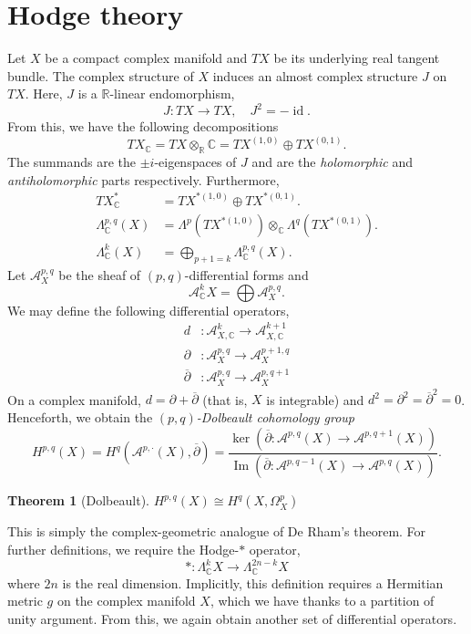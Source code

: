 \documentclass[10pt, a4paper]{article}
\theoremstyle{plain}
\newtheorem{thrm}{Theorem}[section]
\theoremstyle{definition}
\DeclareMathOperator{\Ima}{Im}
\DeclareMathOperator{\id}{id}
\begin{document}
\section{Hodge theory}
Let $X$ be a compact complex manifold and $TX$ be its underlying real tangent bundle. The complex structure of $X$ induces an almost complex structure $J$ on $TX$. Here, $J$ is a $\mathbb{R}$-linear endomorphism,
$$J: TX \rightarrow TX, \quad J^2 = -\id.$$
From this, we have the following decompositions 
$$TX_\mathbb{C} = TX \otimes_\mathbb{R} \mathbb{C} = TX^{(1, 0)} \oplus TX^{(0, 1)}.$$
The summands are the $\pm i$-eigenspaces of $J$ and are the \emph{holomorphic} and \emph{antiholomorphic} parts respectively. Furthermore,
\begin{align*} 
TX^*_\mathbb{C}  &= TX^{*(1, 0)} \oplus TX^{*(0, 1)}.\\
\Lambda^{p, q}_\mathbb{C}(X)  &= \Lambda^p(TX^{*(1, 0)}) \otimes_\mathbb{C} \Lambda^q(TX^{*(0, 1)}).\\
\Lambda^k_\mathbb{C}(X)  &= \bigoplus_{p + 1 = k} \Lambda^{p, q}_\mathbb{C}(X).
\end{align*}
Let $\mathcal{A}^{p, q}_X$ be the sheaf of $(p, q)$-differential forms and 
$$\mathcal{A}^{k}_\mathbb{C} X = \bigoplus \mathcal{A}^{p, q}_X.$$
We may define the following differential operators, 
\begin{align*}
d&: \mathcal{A}^k_{X, \mathbb{C}} \rightarrow \mathcal{A}^{k+1}_{X, \mathbb{C}} \\
\partial&: \mathcal{A}^{p, q}_{X} \rightarrow \mathcal{A}^{p+1, q}_{X} \\
\overline{\partial}&: \mathcal{A}^{p, q}_{X} \rightarrow \mathcal{A}^{p, q+1}_{X} 
\end{align*}
On a complex manifold, $d = \partial + \overline{\partial}$ (that is, $X$ is integrable) and $d^2 = \partial^2 = \overline{\partial}^2 = 0$. Henceforth, we obtain the \emph{$(p, q)$-Dolbeault cohomology group} 
$$H^{p, q}(X) = H^q(\mathcal{A}^{p, \cdot}(X), \overline{\partial}) = \frac{\ker(\overline{\partial}: \mathcal{A}^{p, q}(X) \rightarrow \mathcal{A}^{p, q+1}(X))}{\Ima( \overline{\partial}: \mathcal{A}^{p, q-1}(X) \rightarrow \mathcal{A}^{p, q}(X))}.$$
\begin{thrm}[Dolbeault]
$H^{p, q}(X) \cong H^q(X, \Omega^p_X)$
\end{thrm}
This is simply the complex-geometric analogue of De Rham's theorem. For further definitions, we require the Hodge-$\ast$ operator, 
$$\ast: \Lambda^k_{\mathbb{C}} X \rightarrow \Lambda^{2n-k}_{\mathbb{C}} X$$
where $2n$ is the real dimension. Implicitly, this definition requires a Hermitian metric $g$ on the complex manifold $X$, which we have thanks to a partition of unity argument. From this, we again obtain another set of differential operators.
\end{document}
